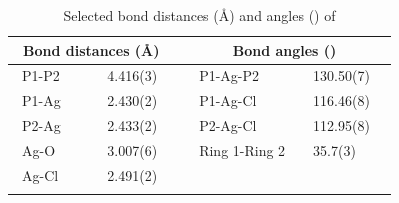 \begin{table}[htbp]
\caption[Selected bond distances (\AA) and angles (\degrees) of ]{Selected bond distances (\AA) and angles (\degrees) of } 
\vspace{1em}
\label{table:crystalthixantphossilverchloride:lengths}
\small
\begin{center}
\begin{tabular}{l l l l}
	\toprule
	\multicolumn{2}{l}{\bfseries{~Bond distances (\si{\angstrom})}} & \multicolumn{2}{c}{\bfseries{Bond angles (\degrees)}} \\
	\midrule		
	~P1-P2		~~&~~4.416(3)~~	&~~P1-Ag-P2			&~~130.50(7)~~	\\	
	~P1-Ag		~~&~~2.430(2)~~	&~~P1-Ag-Cl			&~~116.46(8)~~	\\
	~P2-Ag		~~&~~2.433(2)~~	&~~P2-Ag-Cl			&~~112.95(8)~~	\\
	~Ag-O		~~&~~3.007(6)~~	&~~Ring 1-Ring 2		&~~35.7(3)~~		\\
	~Ag-Cl		~~&~~2.491(2)~~	&~~					&~~		~~		\\
	\bottomrule{}
\end{tabular}
\end{center}
\end{table}

